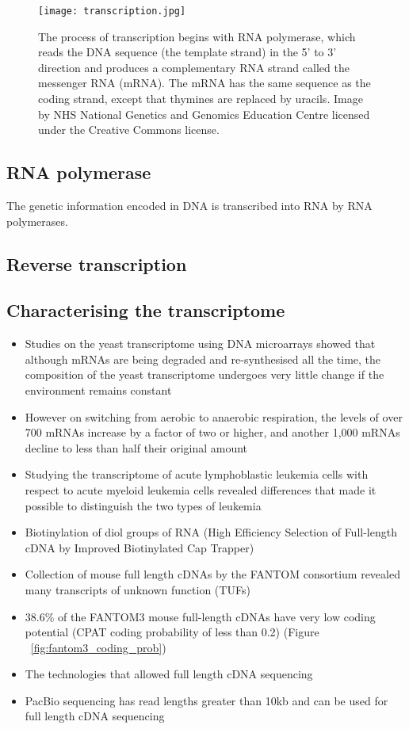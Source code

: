 \begin{figure}[h]
   \centering
   \texttt{[image: transcription.jpg]}
   \caption[DNA transcription]{The process of transcription begins with RNA polymerase, which reads the DNA sequence (the template strand) in the 5' to 3' direction and produces a complementary RNA strand called the messenger RNA (mRNA). The mRNA has the same sequence as the coding strand, except that thymines are replaced by uracils. Image by NHS National Genetics and Genomics Education Centre licensed under the Creative Commons license.}
   \label{fig:transcription}
\end{figure}

\subsection{RNA polymerase}

The genetic information encoded in DNA is transcribed into RNA by RNA polymerases.

\subsection{Reverse transcription}

\subsection{Characterising the transcriptome}

\begin{itemize}

   \item Studies on the yeast transcriptome using DNA microarrays showed that although mRNAs are being degraded and re-synthesised all the time, the composition of the yeast transcriptome undergoes very little change if the environment remains constant
   \item However on switching from aerobic to anaerobic respiration, the levels of over 700 mRNAs increase by a factor of two or higher, and another 1,000 mRNAs decline to less than half their original amount
   \item Studying the transcriptome of acute lymphoblastic leukemia cells with respect to acute myeloid leukemia cells revealed differences that made it possible to distinguish the two types of leukemia
   \item Biotinylation of diol groups of RNA (High Efficiency Selection of Full-length cDNA by Improved Biotinylated Cap Trapper) \cite{pmid8938445}
   \item Collection of mouse full length cDNAs by the FANTOM consortium revealed many transcripts of unknown function (TUFs)
   \item 38.6\% of the FANTOM3 mouse full-length cDNAs have very low coding potential (CPAT coding probability of less than 0.2) (Figure ~\ref{fig:fantom3_coding_prob})
   \item The technologies that allowed full length cDNA sequencing
   \item PacBio sequencing has read lengths greater than 10kb and can be used for full length cDNA sequencing

\end{itemize}

